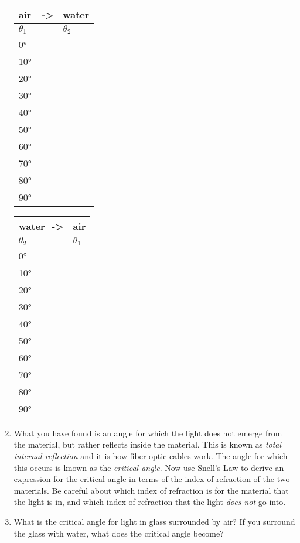 \begin{enumerate}
\begin{tabular}{ll}
	air $\,\,$ ->&water\\
	\toprule
	$\theta_1$ & $\theta_2$ \\
	\midrule
	\midrule
	\ang{0}& \\
	\ang{10}& \\
	\ang{20}&\\
	\ang{30}&\\
	\ang{40}&\\
	\ang{50}&\\
	\ang{60}&\\
	\ang{70}&\\
	\ang{80}&\\
	\ang{90}&\\
	\bottomrule
\end{tabular}\hspace{2in}
\begin{tabular}{ll}
	water$\,\,$ ->&air\\
	\toprule
	$\theta_2$ & $\theta_1$ \\
	\midrule
	\midrule
	\ang{0}& \\
	\ang{10}& \\
	\ang{20}&\\
	\ang{30}&\\
	\ang{40}&\\
	\ang{50}&\\
	\ang{60}&\\
	\ang{70}&\\
	\ang{80}&\\
	\ang{90}&\\
	\bottomrule
\end{tabular}

\item
What you have found is an angle for which the light does not emerge from the material, but rather reflects inside the material. This is known as \emph{total internal reflection} and it is how fiber optic cables work. The angle for which this occurs is known as the \emph{critical angle}. Now use Snell's Law to derive an expression for the critical angle in terms of the index of refraction of the two materials. Be careful about which index of refraction is for the material that the light is in, and which index of refraction that the light \emph{does not} go into.

\item
What is the critical angle for light in glass surrounded by air? If you surround the glass with water, what does the critical angle become?


\end{enumerate}

